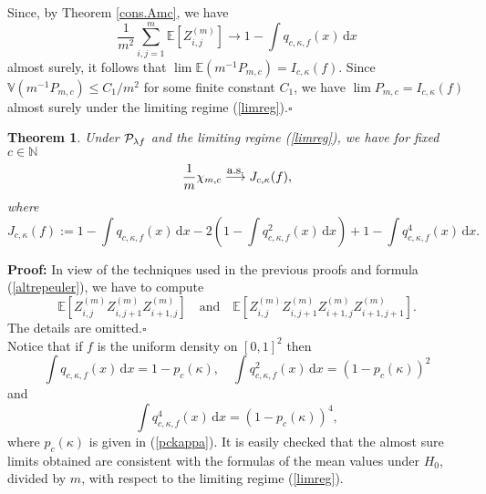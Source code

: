 \documentclass[12pt]{article}
\def\N{\mathbb{N}}
\def\BE{\mathbb{E}}
\def\BV{\mathbb{V}}
\def\cas{\stackrel{\mbox{\small{a.s.}}}{\longrightarrow}}
\newtheorem{theorem}{\bf{Theorem}}[section]
\begin{document}
Since, by Theorem \ref{cons.Amc}, we have
\[
\frac{1}{m^2} \sum_{i,j=1}^m \BE\left[Z_{i,j}^{(m)}\right] \rightarrow 1- \int  q_{c,\kappa,f}(x)\, \textrm{d} x
\]
almost surely, it follows that $\lim \BE(m^{-1}P_{m,c}) = I_{c,\kappa}(f)$. Since $\BV(m^{-1} P_{m,c}) \le C_1/m^2$ for some finite constant $C_1$, we have $\lim P_{m,c} =I_{c,\kappa}(f)$ almost surely under the limiting regime (\ref{limreg}).\hfill$\square$
%
%
\begin{theorem}\label{limitchim}
Under ${\cal P}_{\lambda f}$ and the limiting regime (\ref{limreg}), we have for fixed $c\in\N$
\begin{equation*}
\frac1m\chi_{m,c}\cas J_{c,\kappa}(f),
\end{equation*}
where
\begin{equation*}
J_{c,\kappa}(f):=1-\int  q_{c,\kappa,f}(x)\, \textrm{d} x-2\left(1-\int  q^2_{c,\kappa,f}(x)\, \textrm{d} x\right)+1-\int  q^4_{c,\kappa,f}(x)\, \textrm{d} x.
\end{equation*}
\end{theorem}
%
%
{\bf Proof:} In view of the techniques used in the previous proofs and formula (\ref{altrepeuler}), we have to compute
\begin{equation*}
\BE\left[Z_{i,j}^{(m)}Z_{i,j+1}^{(m)}Z_{i+1,j}^{(m)}\right]\quad\mbox{and}\quad \BE\left[Z_{i,j}^{(m)}Z_{i,j+1}^{(m)}Z_{i+1,j}^{(m)}Z_{i+1,j+1}^{(m)}\right].
\end{equation*}
The details are omitted.\hfill$\square$\\[2mm]
Notice that if  $f$ is the uniform density on $[0,1]^2$ then
\begin{equation*}
\int  q_{c,\kappa,f}(x)\, \textrm{d} x=1-p_c(\kappa),\quad \int  q^2_{c,\kappa,f}(x)\, \textrm{d} x=(1-p_c(\kappa))^2
\end{equation*}
and
\begin{equation*}
\int  q^4_{c,\kappa,f}(x)\, \textrm{d} x =(1-p_c(\kappa))^4,
\end{equation*}
where $p_c(\kappa)$ is given in (\ref{pckappa}). It is easily checked that the almost sure limits obtained are consistent with the formulas of the mean values under $H_0$, divided by $m$, with respect to the limiting regime (\ref{limreg}).
\end{document}
